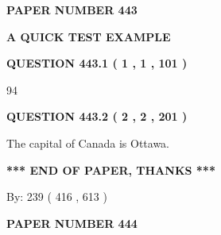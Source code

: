 \documentclass[12pt]{article}
\begin{document}
   
\newpage 
\setcounter{page}{ 
   443001 } 
   
   
   
   
 {\textbf{ \Large{ PAPER NUMBER  443  }}}
   
   
\vspace{0.2in}
   
   
   
   
   
   
 \vspace{0.2in}
{\LARGE {\textbf{ A QUICK TEST EXAMPLE}}}
   
   
  
\vspace{0.2in}
  
{\textbf{\Large{QUESTION
443.1 
 ( 1 , 1 , 101 )
}}}
  
  
 
 
\noindent{}

94
 
 
  
\vspace{0.2in}
  
{\textbf{\Large{QUESTION
443.2 
 ( 2 , 2 , 201 )
}}}
  
  
 
 
\noindent{}
 
 
The capital of Canada is Ottawa.
 
 
 
 
   
   
 \vspace{0.2in}
 
   
   
   
   
\vspace{1.0in} 
{\textbf{\large{ *** END OF PAPER, THANKS *** }}} 
   
   
\hspace{1.0in} By: 
 239 ( 416 ,  613 )
   
   
   
   
\newpage 
\setcounter{page}{ 
   444001 } 
   
   
   
   
 {\textbf{ \Large{ PAPER NUMBER  444  }}}
   
\end{document}
